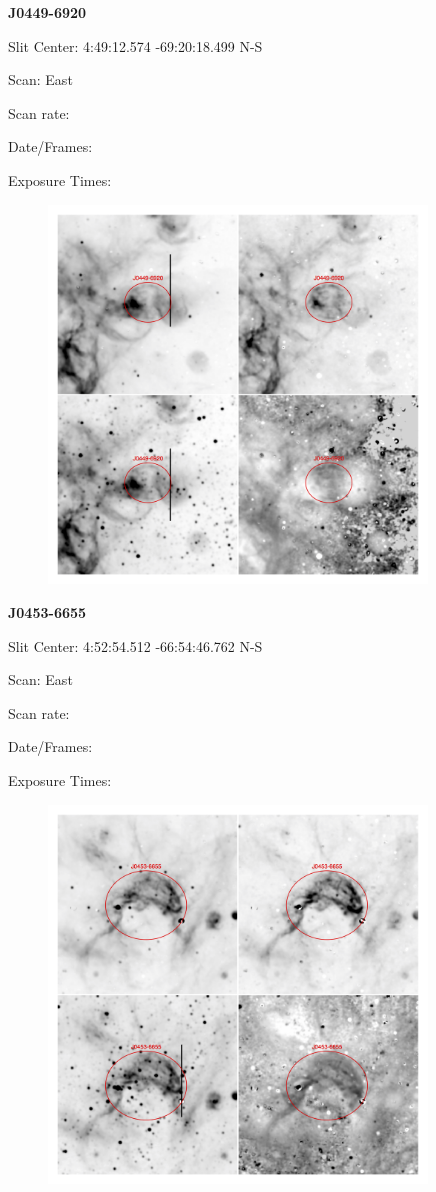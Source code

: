 \documentclass[11pt]{article}
\begin{document}
\newpage
{\bf J0449-6920}

Slit Center:   4:49:12.574     -69:20:18.499     N-S

Scan:  East

Scan rate:  

Date/Frames:

Exposure Times:  

\begin{figure}
\includegraphics[width=10.05cm]{snapshots/J0449-6920.png}
\end{figure}

\newpage
{\bf J0453-6655}

Slit Center:   4:52:54.512    -66:54:46.762     N-S

Scan:  East

Scan rate:  

Date/Frames:

Exposure Times:  

\begin{figure}
\includegraphics[width=10.05cm]{snapshots/J0453-6655.png}
\end{figure}
\end{document}
